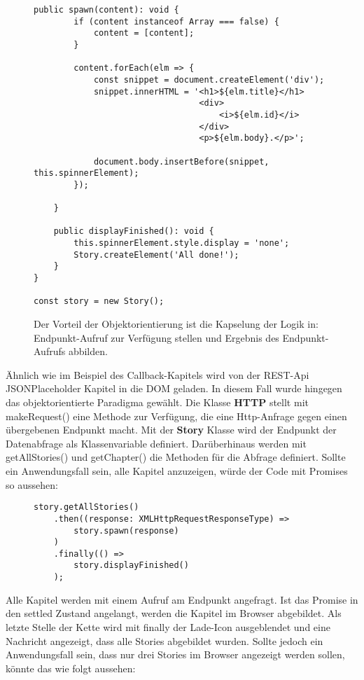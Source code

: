 \begin{figure}[H]
\begin{lstlisting}[basicstyle=\small]  
    public spawn(content): void {
        if (content instanceof Array === false) {
            content = [content];
        }

        content.forEach(elm => {
            const snippet = document.createElement('div');
            snippet.innerHTML = '<h1>${elm.title}</h1>
                                 <div>
                                     <i>${elm.id}</i>
                                 </div>
                                 <p>${elm.body}.</p>';

            document.body.insertBefore(snippet, this.spinnerElement);
        });

    }
    
    public displayFinished(): void {
        this.spinnerElement.style.display = 'none';
        Story.createElement('All done!');
    }
}

const story = new Story();
\end{lstlisting}
\caption{Der Vorteil der Objektorientierung ist die Kapselung der Logik in: Endpunkt-Aufruf zur Verfügung stellen und Ergebnis des Endpunkt-Aufrufs abbilden.}
\end{figure}

\noindent
Ähnlich wie im Beispiel des Callback-Kapitels wird von der REST-Api JSONPlaceholder Kapitel in die DOM geladen. In diesem Fall wurde hingegen das objektorientierte Paradigma gewählt. Die Klasse \textbf{HTTP} stellt mit makeRequest() eine Methode zur Verfügung, die eine Http-Anfrage gegen einen übergebenen Endpunkt macht. Mit der \textbf{Story} Klasse wird der Endpunkt der Datenabfrage als Klassenvariable definiert. Darüberhinaus werden mit getAllStories() und getChapter() die Methoden für die Abfrage definiert. Sollte ein Anwendungsfall sein, alle Kapitel anzuzeigen, würde der Code mit Promises so aussehen:

\begin{figure}[H]
\begin{lstlisting}[basicstyle=\small]
story.getAllStories()
    .then((response: XMLHttpRequestResponseType) =>
        story.spawn(response)
    )
    .finally(() =>
        story.displayFinished()
    );
\end{lstlisting}
\end{figure}

\noindent
Alle Kapitel werden mit einem Aufruf am Endpunkt angefragt. Ist das Promise in den settled Zustand angelangt, werden die Kapitel im Browser abgebildet. Als letzte Stelle der Kette wird mit finally der Lade-Icon ausgeblendet und eine Nachricht angezeigt, dass alle Stories abgebildet wurden. Sollte jedoch ein Anwendungsfall sein, dass nur drei Stories im Browser angezeigt werden sollen, könnte das wie folgt aussehen: 

